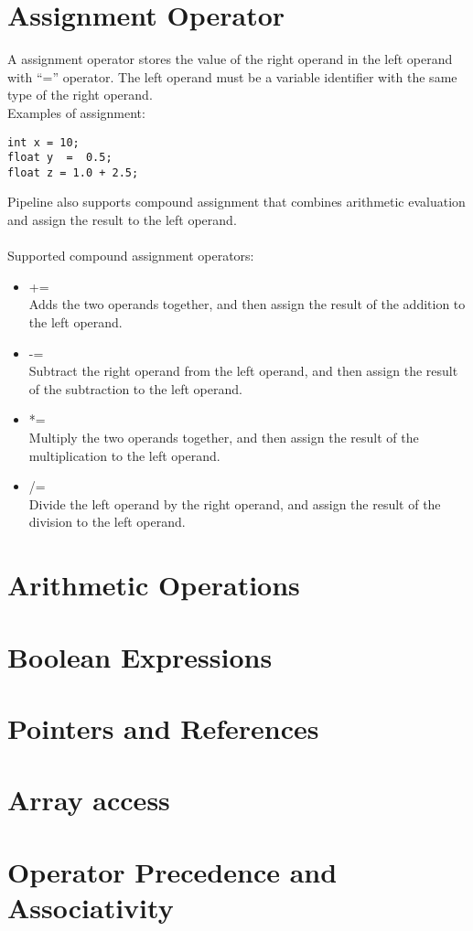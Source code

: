 \documentclass[./LRM_main.tex]{subfiles}
\begin{document}
\section{Assignment Operator}
A assignment operator stores the value of the right operand in the left operand with “=” operator. The left operand must be a variable identifier with the same type of the right operand. \\
Examples of assignment:\\
\begin{lstlisting}
int x = 10; 
float y  =  0.5;  
float z = 1.0 + 2.5;
\end{lstlisting}	
Pipeline also supports compound assignment that combines arithmetic evaluation and assign the result to the left operand. \\
\pagebreak\\
Supported compound assignment operators: \\
\begin{itemize}
\item +=\\
Adds the two operands together, and then assign the result of the addition to the left operand.\\

\item -=\\
Subtract the right operand from the left operand, and then assign the result of the subtraction to the left operand.\\

\item *=\\
Multiply the two operands together, and then assign the result of the multiplication to the left operand.\\

\item /=\\
Divide the left operand by the right operand, and assign the result of the division to the left operand.\\
\end{itemize}
\section{Arithmetic Operations}
\section{Boolean Expressions}
\section{Pointers and References}
\section{Array access}
\section{Operator Precedence and Associativity}


\end{document}

